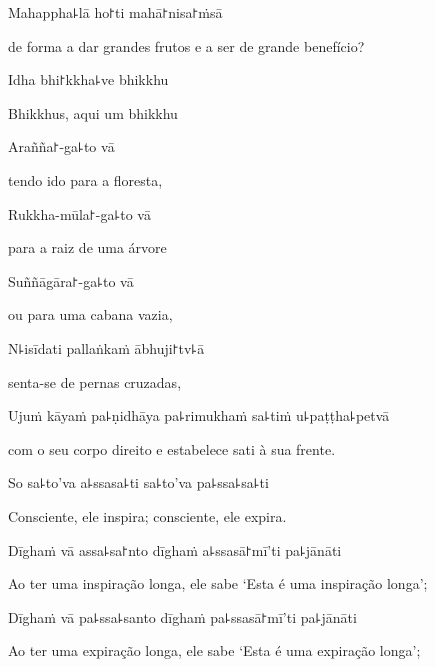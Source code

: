 Mahappha꜕lā ho꜓ti mahā꜓nisa꜓ṁsā

\begin{english}
  de forma a dar grandes frutos e a ser de grande benefício?
\end{english}

Idha bhi꜓kkha꜕ve bhikkhu

\begin{english}
  Bhikkhus, aqui um bhikkhu
\end{english}

Arañña꜓-ga꜕to vā

\begin{english}
  tendo ido para a floresta,
\end{english}

Rukkha-mūla꜓-ga꜕to vā

\begin{english}
  para a raiz de uma árvore
\end{english}

Suññāgāra꜓-ga꜕to vā

\begin{english}
  ou para uma cabana vazia,
\end{english}

N꜕isīdati pallaṅkaṁ ābhuji꜓tv꜕ā

\begin{english}
  senta-se de pernas cruzadas,
\end{english}

Ujuṁ kāyaṁ pa꜕ṇidhāya pa꜕rimukhaṁ sa꜕tiṁ u꜕paṭṭha꜕petvā

\begin{english}
  com o seu corpo direito e estabelece sati à sua frente.
\end{english}

So sa꜕to'va a꜕ssasa꜕ti sa꜕to'va pa꜕ssa꜕sa꜕ti

\begin{english}
  Consciente, ele inspira; consciente, ele expira.
\end{english}

Dīghaṁ vā assa꜕sa꜓nto dīghaṁ a꜕ssasā꜓mī'ti pa꜕jānāti

\begin{english}
  Ao ter uma inspiração longa, ele sabe `Esta é uma inspiração longa';
\end{english}

Dīghaṁ vā pa꜕ssa꜕santo dīghaṁ pa꜕ssasā꜓mī'ti pa꜕jānāti

\begin{english}
  Ao ter uma expiração longa, ele sabe `Esta é uma expiração longa';
\end{english}

